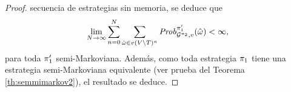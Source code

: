 \begin{proof}
  secuencia de estrategias sin memoria, se deduce que
  \[
  \lim_{N \to \infty} \sum^{N}_{n=0} \sum_{\hat{\omega} \in v(V \setminus T)^n} \mathit{Prob}^{\pi_{1}'}_{\mathcal{G}^{\pi_{2}}, v}(\hat{\omega}) < \infty,
  \]
  para toda $\pi_{1}'$ semi-Markoviana.  Además, como toda
  estrategia $\pi_{1}$ tiene una estrategia semi-Markoviana equivalente (ver
  prueba del Teorema \ref{th:semmimarkov2}), el resultado se deduce.
  \qedhere
\end{proof}





